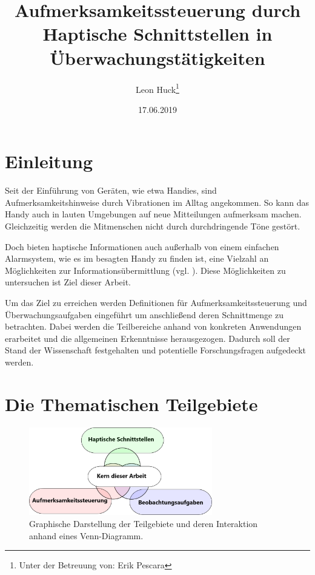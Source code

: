 \documentclass{llncs}					%
\title{Aufmerksamkeitssteuerung durch Haptische Schnittstellen in Überwachungstätigkeiten}
\author{Leon Huck\thanks{Unter der Betreuung von: Erik Pescara}}
\institute{Karlsruher Institut für Technologie}
\date{17.06.2019}
\begin{document}
	
\maketitle

\begin{description}
	\item 
\end{description}

\begin{abstract}
	
\end{abstract}

\newpage
\tableofcontents
\newpage

\clearpage
\section{Einleitung}

Seit der Einführung von Geräten, wie etwa Handies, sind Aufmerksamkeitshinweise durch Vibrationen im Alltag angekommen. So kann das Handy auch in lauten Umgebungen auf neue Mitteilungen aufmerksam machen. Gleichzeitig werden die Mitmenschen nicht durch durchdringende Töne gestört.

Doch bieten haptische Informationen auch außerhalb von einem einfachen Alarmsystem, wie es im besagten Handy zu finden ist, eine Vielzahl an Möglichkeiten zur Informationsübermittlung (vgl. \cite{10.2307/1705360}). Diese Möglichkeiten zu untersuchen ist Ziel dieser Arbeit.

Um das Ziel zu erreichen werden Definitionen für Aufmerksamkeitssteuerung und Überwachungsaufgaben eingeführt um anschließend deren Schnittmenge zu betrachten. Dabei werden die Teilbereiche anhand von konkreten Anwendungen erarbeitet und die allgemeinen Erkenntnisse herausgezogen.
Dadurch soll der Stand der Wissenschaft festgehalten und potentielle Forschungsfragen aufgedeckt werden.

\clearpage
\section{Die Thematischen Teilgebiete}

\begin{figure}[htbp]
	\begin{center}
		\includegraphics[width = 8cm]{Grafiken/Venn-Diagramm.png}
		\caption{Graphische Darstellung der Teilgebiete und deren Interaktion anhand eines Venn-Diagramm.}
		\label{Venn-Diagramm.png}
	\end{center}
\end{figure}
\end{document}
